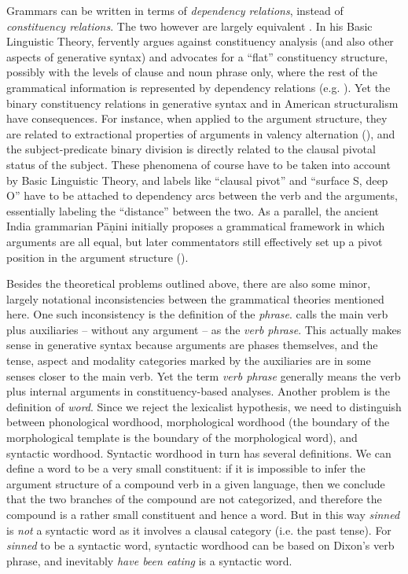 \documentclass[UTF8, a4paper, oneside, scheme=plain, 12pt]{ctexrep}
\newcommand*{\citepage}[1]{p.~{#1}}
\newcommand*{\term}[1]{\emph{#1}}
\newcommand{\form}[1]{\emph{#1}}
\begin{document}
{Grammars can be written in terms of \emph{dependency relations}, instead of \emph{constituency relations}.
The two however are largely equivalent \citep{boston2009dependency}.
In his Basic Linguistic Theory, \citet{dixon2009basic} fervently argues against constituency analysis (and also other aspects of generative syntax) and advocates for a ``flat'' constituency structure, possibly with the levels of clause and noun phrase only,
where the rest of the grammatical information is represented by dependency relations 
(e.g. \citealt[\citepage{49}]{dixon2009basic}).
Yet the binary constituency relations in generative syntax and in American structuralism have consequences.
For instance, when applied to the argument structure,
they are related to extractional properties of arguments in valency alternation (),
and the subject-predicate binary division is directly related to the clausal pivotal status of the subject.
These phenomena of course have to be taken into account by Basic Linguistic Theory,
and labels like ``clausal pivot'' and ``surface S, deep O'' have to be attached to dependency arcs between the verb and the arguments,
essentially labeling the ``distance'' between the two. 
As a parallel, the ancient India grammarian Pāṇini initially proposes a grammatical framework  in which arguments are all equal, but later commentators still effectively set up a pivot position in the argument structure ().

Besides the theoretical problems outlined above, there are also some minor, largely notational inconsistencies between the grammatical theories mentioned here.
One such inconsistency is the definition of the \term{phrase}.
\citet{dixon2009basic} calls the main verb plus auxiliaries -- without any argument -- as the \term{verb phrase}.
This actually makes sense in generative syntax because arguments are phases themselves,
and the tense, aspect and modality categories marked by the auxiliaries are in some senses closer to the main verb.
Yet the term \term{verb phrase} generally means the verb plus internal arguments in constituency-based analyses.
Another problem is the definition of \term{word}.
Since we reject the lexicalist hypothesis,
we need to distinguish between phonological wordhood,
morphological wordhood (the boundary of the morphological template is the boundary of the morphological word),
and syntactic wordhood.
Syntactic wordhood in turn has several definitions.
We can define a word to be a very small constituent:
if it is impossible to infer the argument structure of a compound verb in a given language,
then we conclude that the two branches of the compound are not categorized,
and therefore the compound is a rather small constituent and hence a word.
But in this way \form{sinned} is \emph{not} a syntactic word as it involves a clausal category (i.e. the past tense).
For \form{sinned} to be a syntactic word, syntactic wordhood can be based on Dixon's verb phrase,
and inevitably \form{have been eating} is a syntactic word.

}
\end{document}

